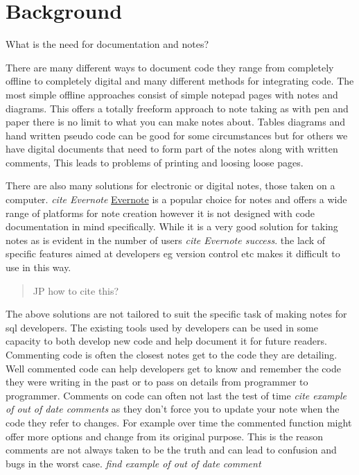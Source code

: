 \chapter{Background}\label{background}

What is the need for documentation and notes?

There are many different ways to document code they range from
completely offline to completely digital and many different methods for
integrating code. The most simple offline approaches consist of simple
notepad pages with notes and diagrams. This offers a totally freeform
approach to note taking as with pen and paper there is no limit to what
you can make notes about. Tables diagrams and hand written pseudo code
can be good for some circumstances but for others we have digital
documents that need to form part of the notes along with written
comments, This leads to problems of printing and loosing loose pages.

There are also many solutions for electronic or digital notes, those
taken on a computer. \emph{cite Evernote}
\href{https://evernote.com}{Evernote} is a popular choice for notes and
offers a wide range of platforms for note creation however it is not
designed with code documentation in mind specifically. While it is a
very good solution for taking notes as is evident in the number of users
\emph{cite Evernote success}. the lack of specific features aimed at
developers eg version control etc makes it difficult to use in this way.

\begin{quote}
JP how to cite this?
\end{quote}

The above solutions are not tailored to suit the specific task of making
notes for sql developers. The existing tools used by developers can be
used in some capacity to both develop new code and help document it for
future readers. Commenting code is often the closest notes get to the
code they are detailing. Well commented code can help developers get to
know and remember the code they were writing in the past or to pass on
details from programmer to programmer. Comments on code can often not
last the test of time \emph{cite example of out of date comments} as
they don't force you to update your note when the code they refer to
changes. For example over time the commented function might offer more
options and change from its original purpose. This is the reason
comments are not always taken to be the truth and can lead to confusion
and bugs in the worst case. \emph{find example of out of date comment}

